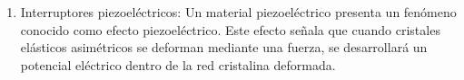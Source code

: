 \begin{enumerate}
\begin{enumerate}
				\item Interruptores piezoeléctricos: Un material piezoeléctrico presenta un fenómeno conocido como efecto piezoeléctrico. Este efecto señala que cuando cristales elásticos asimétricos se deforman mediante una fuerza, se desarrollará un potencial eléctrico dentro de la red cristalina deformada. \cite{saha2010robotics}\\
				
					\begin{figure}[h]
					\centering
					\hfill
				\end{figure}
				
			\end{enumerate}
		\end{enumerate}
		
